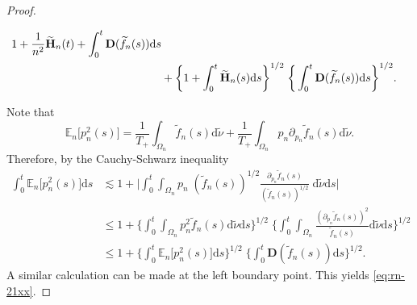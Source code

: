 \documentclass[EJP]{ejpecp} %
\newcommand\E{{\mathbb E}}
\newcommand\Om{\Omega}
\renewcommand{\le}{\leqslant}
\newcommand{\dd  }{\mathrm{d}}
\renewcommand{\tilde}{\widetilde}
\numberwithin{equation}{section}
\begin{document}
\begin{proof}
\begin{lemma}
\begin{align}
 1+ \frac{1}{n^2}\tilde{\mathbf{H}}_n(t)+  
  \int_0^t \mathbf D(\tilde
f_n(s))\dd s \notag\\
&
+\bigg\{1+\int_0^t\tilde{\mathbf{H}}_n(s)\dd s\bigg\}^{1/2}\;\bigg\{\int_0^t \mathbf D(\tilde f_n(s))\dd s\bigg\}^{1/2}.
\end{align} 
\end{lemma}
\proof
Note that
$$
\E_n \big[p_n^2(s)\big]=\frac{1}{T_+}\int_{\Om_n}\tilde f_n(s)\dd\tilde
  \nu+\frac{1}{T_+}\int_{\Om_n}p_n\partial_{p_n}\tilde f_n(s)\dd\tilde
  \nu.
$$
Therefore, by the Cauchy-Schwarz inequality
\begin{align*}
\int_0^t \E_n\big[ p_n^2(s)\big]\dd s &\lesssim 1+\bigg|\int_0^t\int_{\Om_n}p_{n}\; (\tilde f_n(s))^{1/2}\frac{\partial_{p_n}\tilde
   f_n(s)}{(\tilde f_n(s))^{1/2}}\; \dd\tilde\nu \dd s  \bigg|\\
&
\le 1+\bigg\{\int_0^t\int_{\Om_n}p_{n}^2\tilde f_n(s)
  \dd\tilde\nu \dd s \bigg\}^{1/2}\;\bigg\{\int_0^t\int_{\Om_n}\frac{(\partial_{p_n}\tilde
   f_n(s))^2}{\tilde f_n(s)}\dd\tilde\nu \dd s \bigg\}^{1/2}\\
&
\le 1+\bigg\{\int_0^t \E_n \big[p_n^2(s)\big]\dd s\bigg\}^{1/2}\;\bigg\{\int_0^t \mathbf D(\tilde f_n(s))\dd s\bigg\}^{1/2}.
\end{align*}
A similar calculation can be made at the left boundary point. This yields
\eqref{eq:rn-21xx}.






\end{proof}
\end{document}
